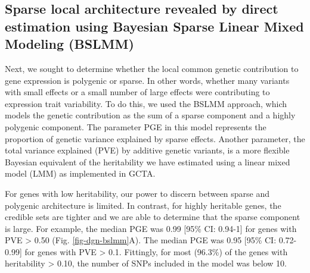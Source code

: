 \documentclass[10pt,letterpaper]{article}
\begin{document}
\subsection*{Sparse local architecture revealed by direct estimation using Bayesian Sparse Linear Mixed Modeling (BSLMM)}

Next, we sought to determine whether the local common genetic contribution to gene expression is polygenic or sparse. In other words, whether many variants with small effects or a small number of large effects were contributing to expression trait variability. To do this, we used the BSLMM \cite{Zhou_2013} approach, which models the genetic contribution as the sum of a sparse component and a highly polygenic component. The parameter PGE in this model represents the proportion of genetic variance explained by sparse effects. Another parameter, the total variance explained (PVE) by additive genetic variants, is a more flexible Bayesian equivalent of the heritability we have estimated using a linear mixed model (LMM) as implemented in GCTA. 

For genes with low heritability, our power to discern between sparse and polygenic architecture is limited. 
In contrast, for highly heritable genes, the credible sets are tighter and we are able to determine that the sparse component is large. For example, the median PGE was 0.99 [95\% CI: 0.94-1] for genes with PVE \textgreater{} 0.50 (Fig. \ref{fig-dgn-bslmm}A). The median PGE was 0.95 [95\% CI: 0.72-0.99] for genes with PVE \textgreater{} 0.1. Fittingly, for most (96.3\%) of the genes with heritability \textgreater{} 0.10, the number of SNPs included in the model was below 10.
\end{document}
